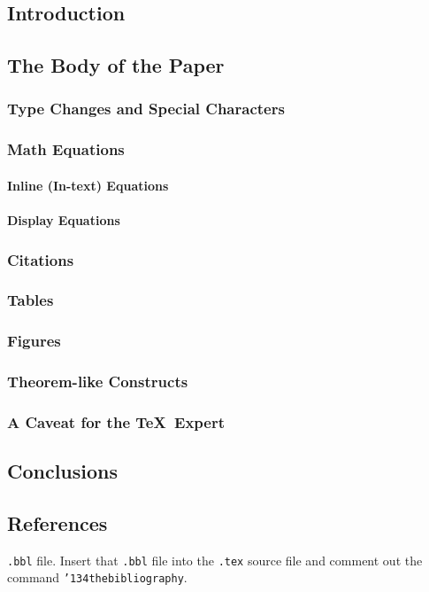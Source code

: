 \documentclass[sigconf]{acmart}
\begin{document}
\subsection{Introduction}
\subsection{The Body of the Paper}
\subsubsection{Type Changes and  Special Characters}
\subsubsection{Math Equations}
\paragraph{Inline (In-text) Equations}
\paragraph{Display Equations}
\subsubsection{Citations}
\subsubsection{Tables}
\subsubsection{Figures}
\subsubsection{Theorem-like Constructs}
\subsubsection*{A Caveat for the \TeX\ Expert}
\subsection{Conclusions}
\subsection{References}

\texttt{.bbl} file.  Insert that \texttt{.bbl} file into the
\texttt{.tex} source file and comment out the command
\texttt{{\char'134}thebibliography}.




 
\end{document}

